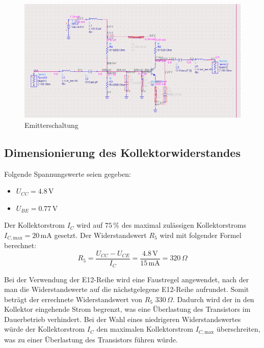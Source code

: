 \begin{figure}[h]
    \centering
    \includegraphics[width=1.0\textwidth]{Pictures/Schaltplan.png}
    \caption{Emitterschaltung}
\end{figure}

\subsection{Dimensionierung des Kollektorwiderstandes}
\label{subsec:rechnungkollektor}

Folgende Spannungswerte seien gegeben:
\begin{itemize}
    \item $U_{CC} = 4.8\,\mathrm{V}$
    \item $U_{BE} = 0.77\,\mathrm{V}$
\end{itemize}

Der Kollektorstrom $I_C$ wird auf $75\,\%$ des maximal zulässigen Kollektorstroms \\$I_{C,\mathrm{max}} = 20\,\mathrm{mA}$ gesetzt. 
Der Widerstandswert $R_5$ wird mit folgender Formel berechnet:
\begin{equation}
    R_5 = \frac{U_{CC} - U_{CE}}{I_C} = \frac{4.8\,\mathrm{V}}{15\,\mathrm{mA}} = 320\,\Omega
\end{equation}

Bei der Verwendung der E12-Reihe wird eine Faustregel angewendet, nach der man die Widerstandswerte auf die nächstgelegene E12-Reihe aufrundet. 
Somit beträgt der errechnete Widerstandswert von $R_5$ 330\,\(\Omega\). Dadurch wird der in den Kollektor eingehende Strom begrenzt, was eine Überlastung des Transistors im Dauerbetrieb verhindert. 
Bei der Wahl eines niedrigeren Widerstandswertes würde der Kollektorstrom $I_C$ den maximalen Kollektorstrom $I_{C,\mathrm{max}}$ überschreiten, was zu einer Überlastung des Transistors führen würde.

